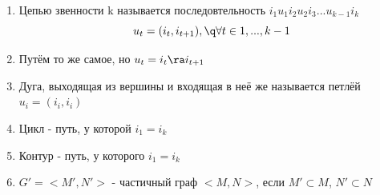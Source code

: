 \documentclass[discrete.tex]{subfiles}
\begin{document}
  \begin{definition}[по Григорьевой]
    \begin{enumerate}
      \item Цепью звенности k называется последовтельность $i_1 u_1 i_2 u_2 i_3 ... u_{k-1} i_k$
      \[u_t = (i_t, i_{t+1}), \q \forall t \in 1,...,k-1\]
      \item Путём то же самое, но $u_t = i_t \ra i_{t+1}$
      \item Дуга, выходящая из вершины и входящая в неё же называется петлёй $u_i=(i_i,i_i)$
      \item Цикл - путь, у которой $i_1 = i_k$
      \item Контур - путь, у которого $i_1 = i_k$
      \item $G'=<M',N'>$ - частичный граф $<M,N>$, если $M' \subset M$, $N' \subset N$
    \end{enumerate}
  \end{definition}
\end{document}
